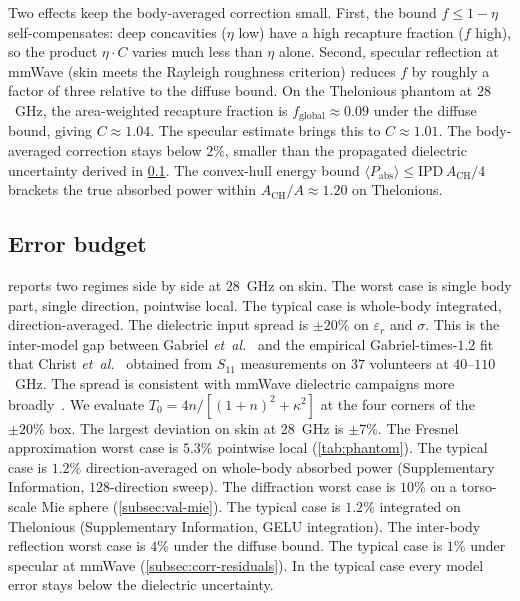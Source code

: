 \documentclass[journal,twocolumn,10pt]{IEEEtran}
\theoremstyle{plain}
\newcommand{\IPD}{\mathrm{IPD}}
\begin{document}
Two effects keep the body-averaged correction small. First, the bound
$f \le 1 - \eta$ self-compensates: deep concavities ($\eta$ low) have
a high recapture fraction ($f$ high), so the product $\eta\cdot C$
varies much less than $\eta$ alone. Second, specular reflection at
mmWave (skin meets the Rayleigh roughness criterion) reduces $f$ by
roughly a factor of three relative to the diffuse bound. On the
Thelonious phantom at $28$~GHz, the area-weighted recapture fraction is
$f_{\mathrm{global}} \approx 0.09$ under the diffuse bound, giving
$C \approx 1.04$. The specular estimate brings this to
$C \approx 1.01$. The body-averaged correction stays below $2\%$,
smaller than the propagated dielectric uncertainty derived in
\cref{subsec:corr-summary}. The convex-hull energy bound
$\langle P_{\mathrm{abs}}\rangle \le \IPD\,A_{\mathrm{CH}}/4$
brackets the true absorbed power within
$A_{\mathrm{CH}}/A \approx 1.20$ on Thelonious.

\subsection{Error budget}\label{subsec:corr-summary}

 reports two regimes side by side at $28$~GHz on
skin. The worst case is single body part, single direction, pointwise
local. The typical case is whole-body integrated, direction-averaged.
The dielectric input spread is $\pm 20\%$ on $\varepsilon_r$ and
$\sigma$. This is the inter-model gap between Gabriel
\textit{et~al.}~\cite{Gabriel1996} and the empirical
Gabriel-times-$1.2$ fit that Christ \textit{et~al.}~\cite{Christ2021}
obtained from $S_{11}$ measurements on $37$ volunteers at
$40$--$110$~GHz. The spread is consistent with mmWave dielectric
campaigns more
broadly~\cite{AlekseevZiskin2007,Sasaki2014,Zhadobov2011}.
We evaluate $T_0 = 4n/[(1+n)^2+\kappa^2]$ at the four corners of the
$\pm 20\%$ box. The largest deviation on skin at $28$~GHz is
$\pm 7\%$. The Fresnel approximation worst case is $5.3\%$ pointwise
local (\cref{tab:phantom}). The typical case is $1.2\%$
direction-averaged on whole-body absorbed power (Supplementary
Information, $128$-direction sweep). The diffraction worst case is
$10\%$ on a torso-scale Mie sphere (\cref{subsec:val-mie}). The
typical case is $1.2\%$ integrated on Thelonious (Supplementary
Information, GELU integration). The inter-body reflection worst
case is $4\%$ under the diffuse bound. The typical case is $1\%$
under specular at mmWave (\cref{subsec:corr-residuals}). In the
typical case every model error stays below the dielectric uncertainty.
\end{document}
